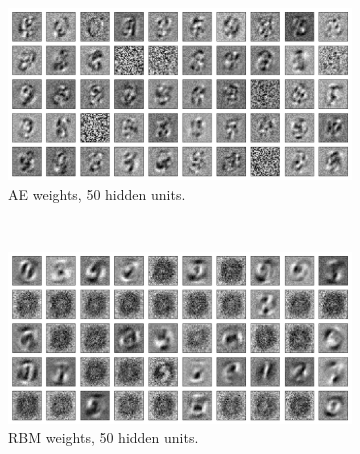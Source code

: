 \documentclass{article}
\begin{document}
\begin{figure}[!ht]
  \centering
  \begin{subfigure}[t]{0.47\textwidth}
    \centering
    \includegraphics[width=\textwidth]{../plots/3_1_2/ae_last_layer_50_components.png}
    \caption{AE weights, 50 hidden units.}
    \label{fig:w50ae}
  \end{subfigure}
  ~
  \addtocounter{subfigure}{1}
  \begin{subfigure}[t]{0.47\textwidth}
    \centering
    \includegraphics[width=\textwidth]{../plots/3_1_2/rbm_last_layer_50_components.png}
    \caption{RBM weights, 50 hidden units.}
    \label{fig:w50rbm}
  \end{subfigure}
  \addtocounter{subfigure}{-2}
  ~
  \begin{subfigure}[t]{0.47\textwidth}
    \centering

\end{subfigure}
\end{figure}
\end{document}
